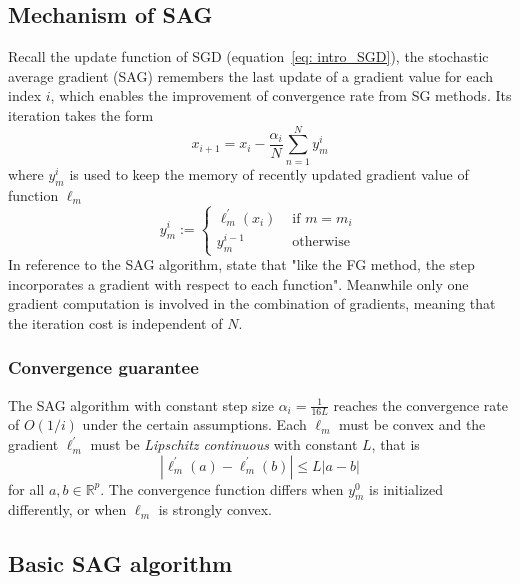 \subsection{Mechanism of SAG}
Recall the update function of SGD (equation~\ref{eq: intro_SGD}), the stochastic average gradient (SAG) remembers the last update of a gradient value for each index $i$, which enables the improvement of convergence rate from SG methods. Its iteration takes the form
\begin{equation}
x_{i+1} = x_i - \frac{\alpha_i}{N} \sum^N_{n=1}y_{m}^{i}
\end{equation}
where $y_{m}^{i}$ is used to keep the memory of recently updated gradient value of function $\ell_m$
\begin{equation}
y_{m}^{i}:=\left\{\begin{array}{ll}
    \ell_{m}^{\prime}\left(x_{i}\right) & \text { if } m=m_{i} \\
    y_{m}^{i-1} & \text { otherwise }
    \end{array}\right.
\end{equation}
In reference to the SAG algorithm, \citeauthor{schmidtMinimizingFiniteSums2016} state that "like the FG method, the step incorporates a gradient with respect to each function". Meanwhile only one gradient computation is involved in the combination of gradients, meaning that the iteration cost is independent of $N$.

\subsubsection{Convergence guarantee}

The SAG algorithm with constant step size $\alpha_i = \frac{1}{16L}$ reaches the convergence rate of $O(1/i)$ under the certain assumptions. Each $\ell_m$ must be convex and the gradient $\ell_m^\prime$ must be \textit{Lipschitz continuous} with constant $L$, that is
\begin{equation}
|\ell_m^\prime (a) - \ell_m^\prime (b)| \leq L|a-b|
\end{equation}
for all $a,b \in \mathbb{R}^p$.
The convergence function differs when $y_m^0$ is initialized differently, or when $\ell_m$ is strongly convex.


\subsection{Basic SAG algorithm}

